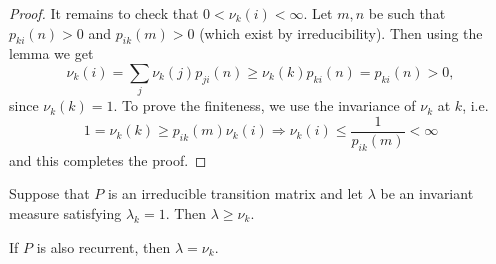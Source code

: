 \documentclass[a4paper,11pt]{article}
\begin{document}
\begin{proof}
    It remains to check that $0<\nu_k(i)<\infty$. Let $m, n$ be such that $p_{k i}(n)>0$ and $p_{i k}(m)>0$ (which exist by irreducibility). Then using the lemma we get
    \[
    \nu_k(i) = \sum _{j} \nu_k(j)p_{ji}(n) \geq \nu_k(k) p_{k i}(n)=p_{k i}(n)>0,
    \]
    since $\nu_k(k)=1$. To prove the finiteness, we use the invariance of $\nu_k$ at $k$, i.e.
    \[
    1=\nu_k(k) \geq p_{i k}(m) \nu_k(i) \Rightarrow \nu_k(i) \leq \frac{1}{p_{i k}(m)}<\infty
    \]
    and this completes the proof.
\end{proof}

\begin{theorem}\label{thm:8.9}
    Suppose that $P$ is an irreducible transition matrix and let $\lambda$ be an invariant measure satisfying $\lambda_k=1$. Then $\lambda \geq \nu_k$.

    If $P$ is also recurrent, then $\lambda=\nu_k$.
\end{theorem}
\end{document}
